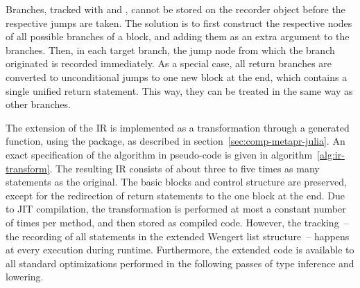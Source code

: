 Branches, tracked with  and , cannot be stored on the
recorder object before the respective jumps are taken.  The solution is to first construct the
respective nodes of all possible branches of a block, and adding them as an extra argument to the
branches.  Then, in each target branch, the jump node from which the branch originated is
recorded immediately.  As a special case, all return branches are converted to unconditional jumps
to one new block at the end, which contains a single unified return statement.  This way, they can
be treated in the same way as other branches.

The extension of the IR is implemented as a transformation through a generated function, using the
 package, as described in section~\ref{sec:comp-metapr-julia}.  An exact
specification of the algorithm in pseudo-code is given in algorithm~\ref{alg:ir-transform}.  The
resulting IR consists of about three to five times as many statements as the original.  The basic
blocks and control structure are preserved, except for the redirection of return statements to the
one block at the end.  Due to JIT compilation, the transformation is performed at most a constant
number of times per method, and then stored as compiled code.  However, the tracking~-- the
recording of all statements in the extended Wengert list structure~-- happens at every execution
during runtime.  Furthermore, the extended code is available to all standard optimizations performed
in the following passes of type inference and lowering.


